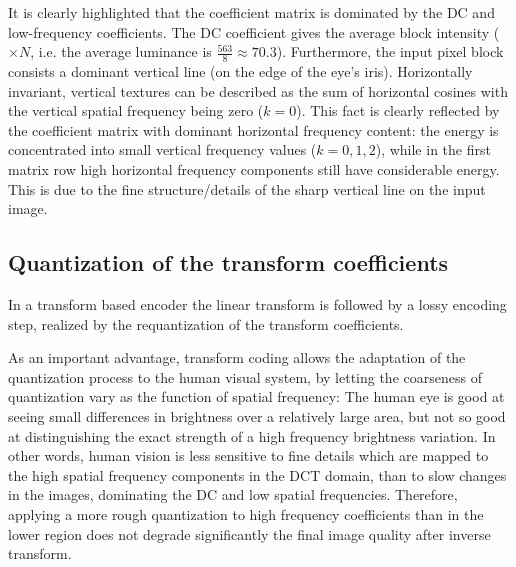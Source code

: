 It is clearly highlighted that the coefficient matrix is dominated by the DC and low-frequency coefficients.
The DC coefficient gives the average block intensity ($\times N$, i.e. the average luminance is $ \frac{563}{8} \approx 70.3$).
Furthermore, the input pixel block consists a dominant vertical line (on the edge of the eye's iris).
Horizontally invariant, vertical textures can be described as the sum of horizontal cosines with the vertical spatial frequency being zero ($k = 0$).
This fact is clearly reflected by the coefficient matrix with dominant horizontal frequency content: the energy is concentrated into small vertical frequency values ($k = 0, 1,2 $), while in the first matrix row high horizontal frequency components still have considerable energy.
This is due to the fine structure/details of the sharp vertical line on the input image.

\subsection{Quantization of the transform coefficients}

In a transform based encoder the linear transform is followed by a lossy encoding step, realized by the requantization of the transform coefficients.

As an important advantage, transform coding allows the adaptation of the quantization process to the human visual system,
by letting the coarseness of quantization vary as the function of spatial frequency:
The human eye is good at seeing small differences in brightness over a relatively large area, but not so good at distinguishing the exact strength of a high frequency brightness variation. 
In other words, human vision is less sensitive to fine details which are mapped to the high spatial frequency components in the DCT domain, than to slow changes in the images, dominating the DC and low spatial frequencies.
Therefore, applying a more rough quantization to high frequency coefficients than in the lower region does not degrade significantly the final image quality after inverse transform.

